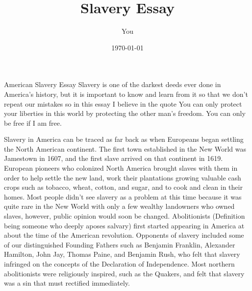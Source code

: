\documentclass[a4paper]{article}
\title{Slavery Essay}
\author{You}
\date{\today}
\begin{document}
\maketitle
 American Slavery Essay
Slavery is one of the darkest deeds ever done in America's history, but it is important to know and learn from it so that we don't repeat our mistakes so in this essay I believe in the quote You can only protect your liberties in this world by protecting the other man's 
freedom. You can only be free if I am free. 

Slavery in America can be traced as far back as when Europeans began settling the North American continent. The first town established in the New World was Jamestown in 1607, and the first slave arrived on that continent in 1619. European pioneers who colonized North America brought slaves with them in order to help settle the new land, work their plantations growing valuable cash crops such as tobacco, wheat, cotton, and sugar, and to cook and clean in their homes. Most people didn't see slavery as a problem at this time because it was quite rare in the New World with only a few wealthy landowners who owned slaves, however, public opinion would soon be changed.
%
%
%
Abolitionists (Definition being someone who deeply aposes salvary) first started appearing in America at about the time of the American revolution. Opponents of slavery included some of our distinguished Founding Fathers such as Benjamin Franklin, Alexander Hamilton, John Jay, Thomas Paine, and Benjamin Rush, who felt that slavery  infringed on the concepts of the Declaration of Independence. Most northern abolitionists were religiously inspired, such as the Quakers, and felt that slavery was a sin that must rectified immediately.
\end{document}
